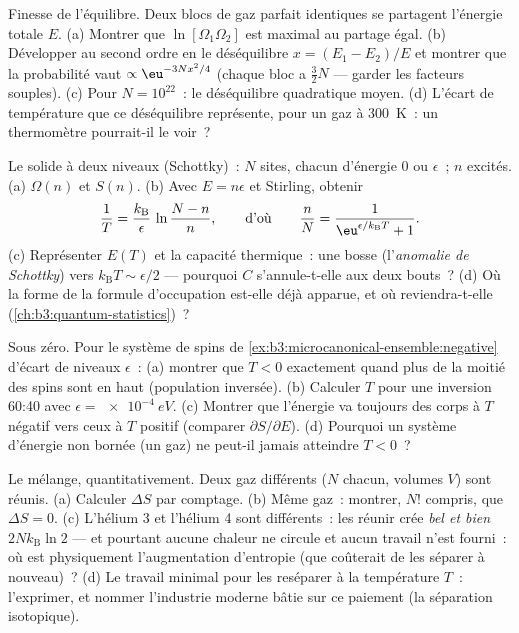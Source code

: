 \begin{exercise}[$\star\star$]\label{exo:b3:microcanonical-ensemble:7}
Finesse de l'équilibre. Deux blocs de gaz parfait identiques se
partagent l'énergie totale $E$. (a) Montrer que
$\ln[\Omega_1\Omega_2]$ est maximal au partage égal. (b) Développer au
second ordre en le déséquilibre $x =
(E_1 - E_2)/E$ et montrer que la probabilité vaut
$\propto\eu^{-3Nx^2/4}$ (chaque bloc a $\tfrac32 N$ 
--- garder les facteurs souples). (c) Pour $N = 10^{22}$~: le
déséquilibre quadratique moyen. (d) L'écart de température que ce
déséquilibre représente, pour un gaz à \qty{300}{K}~: un thermomètre
pourrait-il le voir~?
\end{exercise}

\begin{exercise}[$\star\star$]\label{exo:b3:microcanonical-ensemble:8}
Le solide à deux niveaux (Schottky)~: $N$ sites, chacun d'énergie $0$
ou $\epsilon$~; $n$ excités. (a) $\Omega(n)$ et $S(n)$. (b) Avec $E =
n\epsilon$ et Stirling, obtenir
\[
\frac1T = \frac{k_{\text{B}}}{\epsilon}\,
\ln\frac{N - n}{n} ,
\qquad\text{d'où}\qquad
\frac nN = \frac{1}{\eu^{\epsilon/k_{\text{B}}T} + 1} .
\]
(c) Représenter $E(T)$ et la capacité thermique~: une bosse
(l'\emph{anomalie de Schottky}) vers $k_{\text{B}}T \sim \epsilon/2$
--- pourquoi $C$ s'annule-t-elle aux deux bouts~? (d) Où la forme de
la formule d'occupation est-elle déjà apparue, et où reviendra-t-elle
(\cref{ch:b3:quantum-statistics})~?
\end{exercise}

\begin{exercise}[$\star\star$]\label{exo:b3:microcanonical-ensemble:9}
Sous zéro. Pour le système de spins de
\cref{ex:b3:microcanonical-ensemble:negative} d'écart de niveaux
$\epsilon$~: (a) montrer que $T < 0$ exactement quand plus de la
moitié des spins sont en haut (population inversée). (b) Calculer $T$
pour une inversion 60:40 avec $\epsilon = \qty{e-4}{eV}$. (c) Montrer
que l'énergie va toujours des corps à $T$ négatif vers ceux à $T$
positif (comparer $\partial
S/\partial E$). (d) Pourquoi un système d'énergie non bornée (un gaz)
ne peut-il jamais atteindre $T < 0$~?
\end{exercise}

\begin{exercise}[$\star\star\star$]\label{exo:b3:microcanonical-ensemble:10}
Le mélange, quantitativement. Deux gaz différents ($N$ chacun, volumes
$V$) sont réunis. (a) Calculer $\Delta S$ par comptage. (b) Même gaz~:
montrer, $N!$ compris, que $\Delta S = 0$. (c) L'hélium 3 et
l'hélium 4 sont différents~: les réunir crée \emph{bel et bien}
$2Nk_{\text{B}}\ln2$ --- et pourtant aucune chaleur ne circule et
aucun travail n'est fourni~: où est physiquement l'augmentation
d'entropie (que coûterait de les séparer à nouveau)~? (d) Le travail
minimal pour les reséparer à la température $T$~: l'exprimer, et
nommer l'industrie moderne bâtie sur ce paiement (la séparation
isotopique).
\end{exercise}

